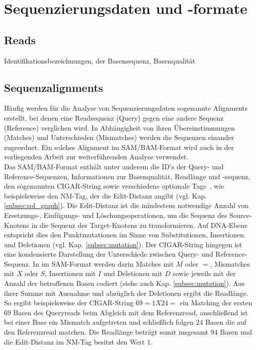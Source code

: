 \section{Sequenzierungsdaten und -formate}
\subsection{Reads} \label{subsec:fastq}
Identifikationsbezeichnungen, der Basensequenz, Basenqualität 

\subsection{Sequenzalignments} \label{subsec:samformat}

Häufig werden für die Analyse von Sequenzierungsdaten sogenannte Alignments erstellt, bei denen eine Readsequenz (Query) gegen eine andere Sequenz (Reference) verglichen wird. In Abhängigkeit von ihren Übereinstimmungen (Matches) und Unterschieden (Mismatches) werden die Sequenzen einander zugeordnet. Ein solches Alignment im SAM/BAM-Format wird auch in der vorliegenden Arbeit zur weiterführenden Analyse verwendet. \\

Das SAM/BAM-Format enthält unter anderem die ID's der Query- und Reference-Sequenzen, Informationen zur Basenqualität, Readlänge und -sequenz, den sogenannten CIGAR-String sowie verschiedene optionale Tags~\cite{sam_bam, li_2009}, wie beispielsweise den NM-Tag, der die Edit-Distanz angibt (vgl. Kap. \ref{subsec:sol_graph}). Die Edit-Distanz ist die mindestens notwendige Anzahl von Ersetzungs-, Einfügungs- und Löschungsoperationen, um die Sequenz des Source-Knotens in die Sequenz des Target-Knotens zu transformieren. Auf DNA-Ebene entspricht dies den Punktmutationen im Sinne von Substitutionen, Insertionen und Deletionen (vgl. Kap. \ref{subsec:mutation}). Der CIGAR-String hingegen ist eine kondensierte Darstellung der Unterschiede zwischen Query- und Reference-Sequenz. In im SAM-Format werden darin Matches mit $ M $ oder $ = $, Mismatches mit $ X $  oder $ S $,  Insertionen mit $ I $ und Deletionen mit $ D $ sowie jeweils mit der Anzahl der betroffenen Basen codiert (siehe auch Kap. \ref{subsec:mutation}). Aus ihrer Summe mit Ausnahme und abzüglich der Deletionen ergibt die Readlänge. So ergibt beispielsweise der CIGAR-String $ 69=1X24= $ ein Matching der ersten $ 69 $ Basen des Queryreads beim Abgleich mit dem Referenzread, anschließend ist bei einer Base ein Mismatch aufgetreten und schließlich folgen $ 24 $ Basen die auf den Referenzread matchen. Die Readlänge beträgt somit insgesamt $ 94 $ Basen und die Edit-Distanz im NM-Tag besitzt den Wert $ 1 $. \\

